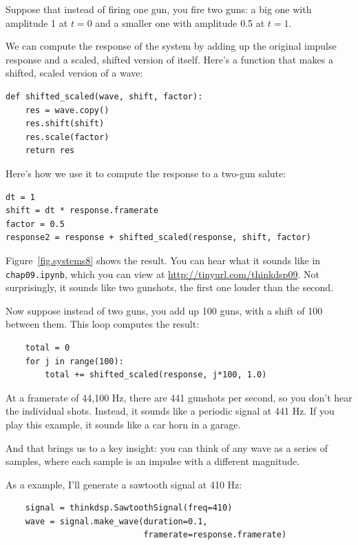 \documentclass[12pt]{book}
\begin{document}
Suppose that instead of firing one gun, you fire two guns:
a big one with amplitude 1 at $t=0$ and a smaller one with
amplitude 0.5 at $t=1$.

We can compute the response of the system by adding up
the original impulse response and a scaled, shifted version of itself.
Here's a function that makes a shifted, scaled version of
a wave:

\begin{verbatim}
def shifted_scaled(wave, shift, factor):
    res = wave.copy()
    res.shift(shift)
    res.scale(factor)
    return res
\end{verbatim}

Here's how we use it to compute the response to a two-gun salute:

\begin{verbatim}
dt = 1
shift = dt * response.framerate
factor = 0.5
response2 = response + shifted_scaled(response, shift, factor)
\end{verbatim}

Figure~\ref{fig.systems8} shows the result.  You can hear what
it sounds like in {\tt chap09.ipynb}, which you can view
at \url{http://tinyurl.com/thinkdsp09}.  Not surprisingly, it
sounds like two gunshots, the first one louder than the second.

Now suppose instead of two guns, you add up 100 guns, with
a shift of 100 between them.  This loop computes the result:

\begin{verbatim}
    total = 0
    for j in range(100):
        total += shifted_scaled(response, j*100, 1.0)
\end{verbatim}

At a framerate of 44,100 Hz, there are 441 gunshots per second,
so you don't hear the individual shots.  Instead, it sounds
like a periodic signal at 441 Hz.  If you play this example, it
sounds like a car horn in a garage.

And that brings us to a key insight: you can think of any wave as a
series of samples, where each sample is an impulse with a different
magnitude.

As a example, I'll generate a sawtooth signal at 410 Hz:

\begin{verbatim}
    signal = thinkdsp.SawtoothSignal(freq=410)
    wave = signal.make_wave(duration=0.1,
                            framerate=response.framerate)
\end{verbatim}
\end{document}
